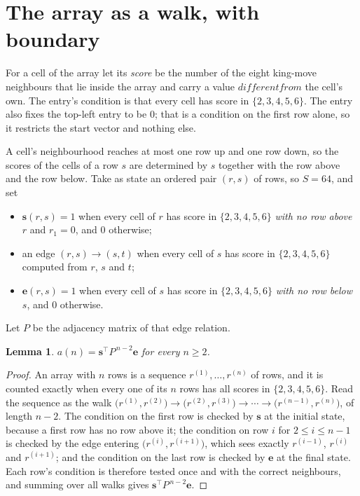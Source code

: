 \documentclass[11pt,a4paper]{article}
\theoremstyle{plain}
\newtheorem{lemma}[theorem]{Lemma}
\theoremstyle{definition}
\begin{document}
\section{The array as a walk, with boundary}

For a cell of the array let its \emph{score} be the number of the eight king-move neighbours that lie inside
the array and carry a value $different from$ the cell's own. The entry's condition is that every cell
has score in $\{2,3,4,5,6\}$. The entry also fixes the top-left entry to be $0$; that is a condition on the first row alone, so it restricts the start vector and nothing else.

A cell's neighbourhood reaches at most one row up and one row down, so the scores of the
cells of a row $s$ are determined by $s$ together with the row above and the row below.
Take as state an ordered pair $(r,s)$ of rows, so $S=64$, and set
\begin{itemize}
\item $\mathbf{s}(r,s)=1$ when every cell of $r$ has score in $\{2,3,4,5,6\}$ \emph{with no row
above $r$} and $r_1=0$, and $0$ otherwise;
\item an edge $(r,s)\to(s,t)$ when every cell of $s$ has score in $\{2,3,4,5,6\}$ computed from
$r$, $s$ and $t$;
\item $\mathbf{e}(r,s)=1$ when every cell of $s$ has score in $\{2,3,4,5,6\}$ \emph{with no row
below $s$}, and $0$ otherwise.
\end{itemize}
Let $P$ be the adjacency matrix of that edge relation.

\begin{lemma}\label{lem:walk}
$a(n)=\mathbf{s}^{\!\top}P^{\,n-2}\mathbf{e}$ for every $n\ge2$.
\end{lemma}

\begin{proof}
An array with $n$ rows is a sequence $r^{(1)},\dots,r^{(n)}$ of rows, and it is counted
exactly when every one of its $n$ rows has all scores in $\{2,3,4,5,6\}$. Read the sequence as the
walk $\bigl(r^{(1)},r^{(2)}\bigr)\to\bigl(r^{(2)},r^{(3)}\bigr)\to\cdots\to
\bigl(r^{(n-1)},r^{(n)}\bigr)$, of length $n-2$. The condition on the first row is
checked by $\mathbf{s}$ at the initial state, because a first row has no row above it; the
condition on row $i$ for $2\le i\le n-1$ is checked by the edge entering
$\bigl(r^{(i)},r^{(i+1)}\bigr)$, which sees exactly $r^{(i-1)}$, $r^{(i)}$ and
$r^{(i+1)}$; and the condition on the last row is checked by $\mathbf{e}$ at the final
state. Each row's condition is therefore tested once and with the correct neighbours, and
summing over all walks gives $\mathbf{s}^{\!\top}P^{\,n-2}\mathbf{e}$.
\end{proof}
\end{document}
